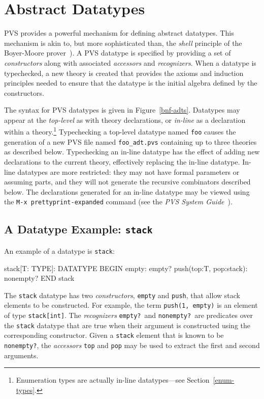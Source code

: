 
\chapter{Abstract Datatypes}\label{datatypes}\label{adts}

PVS provides a powerful mechanism for defining abstract datatypes.  This
mechanism is akin to, but more sophisticated than, the \emph{shell}
principle of the Boyer-Moore prover~\cite{Boyer-Moore79}).  A PVS datatype
is specified by providing a set of \emph{constructors} along with
associated \emph{accessors} and \emph{recognizers}.  When a datatype is
typechecked, a new theory is created that provides the axioms and
induction principles needed to ensure that the datatype is the initial
algebra defined by the constructors.


The syntax for PVS datatypes is given in Figure~\ref{bnf-adts}.  Datatypes
may appear at the \emph{top-level} as with theory declarations, or
\emph{in-line} as a declaration within a theory.\footnote{Enumeration
types are actually in-line datatypes---see Section~\ref{enum-types}.}
Typechecking a top-level datatype named \texttt{foo} causes the generation
of a new PVS file named \texttt{foo\_adt.pvs} containing up to three
theories as described below.  Typechecking an in-line datatype has the
effect of adding new declarations to the current theory, effectively
replacing the in-line datatype.  In-line datatypes are more restricted:
they may not have formal parameters or assuming parts, and they will not
generate the recursive combinators described below.  The declarations
generated for an in-line datatype may be viewed using the
\texttt{M-x~prettyprint-expanded} command (see the \emph{PVS System
Guide}~\cite{PVS:userguide}).

\section{A Datatype Example: \texttt{stack}}\label{stacks-adt}
An example of a datatype is \texttt{stack}:
\begin{session}
  stack[T: TYPE]: DATATYPE
   BEGIN
    empty: empty?
    push(top:T, pop:stack): nonempty?
   END stack
\end{session}
The \texttt{stack} datatype has two \emph{constructors}, \texttt{empty} and
\texttt{push}, that allow stack elements to be constructed.  For example,
the term \texttt{push(1, empty)} is an element of type \texttt{stack[int]}.
The \emph{recognizers} \texttt{empty?}\ and \texttt{nonempty?}\ are predicates
over the \texttt{stack} datatype that are true when their argument is
constructed using the corresponding constructor.  Given a \texttt{stack}
element that is known to be \texttt{nonempty?}, the \emph{accessors}
\texttt{top} and \texttt{pop} may be used to extract the first and second
arguments.

